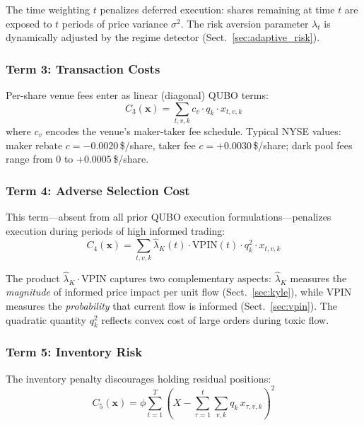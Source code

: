 \documentclass[11pt]{article}
\newcommand{\bx}{\mathbf{x}}
\begin{document}
The time weighting $t$ penalizes deferred execution: shares remaining at time $t$ are exposed to $t$ periods of price variance $\sigma^2$. The risk aversion parameter $\lambda_t$ is dynamically adjusted by the regime detector (Sect.~\ref{sec:adaptive_risk}).

\subsubsection{Term 3: Transaction Costs}

Per-share venue fees enter as linear (diagonal) QUBO terms:
\begin{equation}
C_3(\bx) = \sum_{t,v,k} c_v \cdot q_k \cdot x_{t,v,k}
\label{eq:C3}
\end{equation}
where $c_v$ encodes the venue's maker-taker fee schedule. Typical NYSE values: maker rebate $c = -0.0020$\,\$/share, taker fee $c = +0.0030$\,\$/share; dark pool fees range from $0$ to $+0.0005$\,\$/share.

\subsubsection{Term 4: Adverse Selection Cost}

This term---absent from all prior QUBO execution formulations---penalizes execution during periods of high informed trading:
\begin{equation}
C_4(\bx) = \sum_{t,v,k} \hat{\lambda}_K(t) \cdot \mathrm{VPIN}(t) \cdot q_k^2 \cdot x_{t,v,k}
\label{eq:C4}
\end{equation}

The product $\hat{\lambda}_K \cdot \mathrm{VPIN}$ captures two complementary aspects: $\hat{\lambda}_K$ measures the \emph{magnitude} of informed price impact per unit flow (Sect.~\ref{sec:kyle}), while VPIN measures the \emph{probability} that current flow is informed (Sect.~\ref{sec:vpin}). The quadratic quantity $q_k^2$ reflects convex cost of large orders during toxic flow.

\subsubsection{Term 5: Inventory Risk}

The inventory penalty discourages holding residual positions:
\begin{equation}
C_5(\bx) = \phi \sum_{t=1}^{T} \left(X - \sum_{\tau=1}^{t} \sum_{v,k} q_k \, x_{\tau,v,k}\right)^2
\label{eq:C5}
\end{equation}
\end{document}
